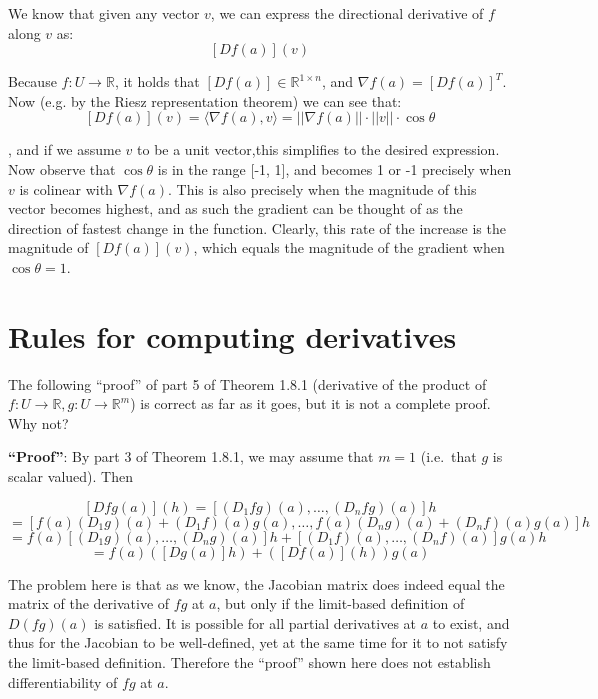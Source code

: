 \begin{solution}

    We know that given any vector $v$, we can express the directional derivative of $f$ along $v$ as:
    $$[Df(a)] (v)$$

    Because $f: U \rightarrow \mathbb{R}$, it holds that $[D f(a)] \in \mathbb{R}^{1 \times n}$, and $\nabla f(a) = [D f(a)]^T$. Now (e.g. by the Riesz representation theorem) we can see that:
    $$[D f(a)](v) = \langle \nabla f(a), v \rangle = \lvert \lvert \nabla f(a) \rvert \rvert \cdot \lvert \lvert v \rvert \rvert \cdot \cos \theta$$

    , and if we assume $v$ to be a unit vector,this simplifies to the desired expression. Now observe that $\cos \theta$ is in the range [-1, 1], and becomes 1 or -1 precisely when $v$ is colinear with $\nabla f(a)$. This is also precisely when the magnitude of this vector becomes highest, and as such the gradient can be thought of as the direction of fastest change in the function. Clearly, this rate of the increase is the magnitude of $[Df(a)](v)$, which equals the magnitude of the gradient when $\cos \theta = 1$.
    
\end{solution}

\section{Rules for computing derivatives}

\begin{exercise}{5}
    The following ``proof'' of part 5 of Theorem 1.8.1 (derivative of the product of $f: U \rightarrow \mathbb{R}, g: U \rightarrow \mathbb{R}^m$) is correct as far as it goes, but it is not a complete proof.
    Why not?

    \textbf{``Proof''}: By part 3 of Theorem 1.8.1, we may assume that $m = 1$ (i.e.\ that $g$ is scalar valued).
    Then

    $$[D fg(a)](h) = [(D_1 fg)(a), \ldots, (D_nfg)(a)]h$$
    $$ = [f(a)(D_1 g)(a) + (D_1 f)(a)g(a), \ldots, f(a)(D_n g)(a) + (D_n f)(a)g(a)]h$$
    $$ = f(a)[(D_1 g)(a), \ldots, (D_n g)(a)]h + [(D_1 f)(a), \ldots, (D_n f)(a)]g(a) h$$
    $$ = f(a)([D g(a)]h) + ([D f(a)](h))g(a)$$
\end{exercise}

\begin{solution}

    The problem here is that as we know, the Jacobian matrix does indeed equal the matrix of the derivative of $fg$ at $a$, but only if the limit-based definition of $D (fg)(a)$ is satisfied.
    It is possible for all partial derivatives at $a$ to exist, and thus for the Jacobian to be well-defined, yet at the same time for it to not satisfy the limit-based definition.
    Therefore the ``proof'' shown here does not establish differentiability of $fg$ at $a$.
\end{solution}

